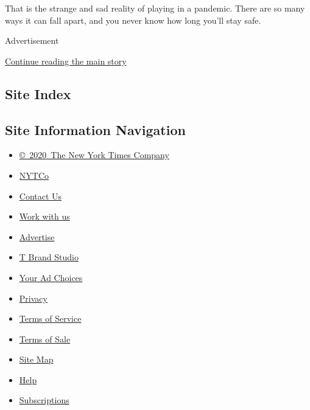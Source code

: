 That is the strange and sad reality of playing in a pandemic. There are
so many ways it can fall apart, and you never know how long you'll stay
safe.

Advertisement

\protect\hyperlink{after-bottom}{Continue reading the main story}

\hypertarget{site-index}{%
\subsection{Site Index}\label{site-index}}

\hypertarget{site-information-navigation}{%
\subsection{Site Information
Navigation}\label{site-information-navigation}}

\begin{itemize}
\tightlist
\item
  \href{https://help.nytimes.com/hc/en-us/articles/115014792127-Copyright-notice}{©~2020~The
  New York Times Company}
\end{itemize}

\begin{itemize}
\tightlist
\item
  \href{https://www.nytco.com/}{NYTCo}
\item
  \href{https://help.nytimes.com/hc/en-us/articles/115015385887-Contact-Us}{Contact
  Us}
\item
  \href{https://www.nytco.com/careers/}{Work with us}
\item
  \href{https://nytmediakit.com/}{Advertise}
\item
  \href{http://www.tbrandstudio.com/}{T Brand Studio}
\item
  \href{https://www.nytimes.com/privacy/cookie-policy\#how-do-i-manage-trackers}{Your
  Ad Choices}
\item
  \href{https://www.nytimes.com/privacy}{Privacy}
\item
  \href{https://help.nytimes.com/hc/en-us/articles/115014893428-Terms-of-service}{Terms
  of Service}
\item
  \href{https://help.nytimes.com/hc/en-us/articles/115014893968-Terms-of-sale}{Terms
  of Sale}
\item
  \href{https://spiderbites.nytimes.com}{Site Map}
\item
  \href{https://help.nytimes.com/hc/en-us}{Help}
\item
  \href{https://www.nytimes.com/subscription?campaignId=37WXW}{Subscriptions}
\end{itemize}
